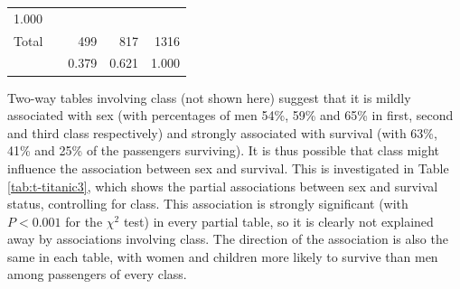 \documentclass[11pt,a4paper,openany]{book}
\begin{document}
\begin{longtable}[]{@{}llrrr@{}}
\begin{minipage}[t]{0.07\columnwidth}
1.000\strut
\end{minipage}\tabularnewline
\begin{minipage}[t]{0.30\columnwidth}\raggedright\strut
Total\strut
\end{minipage} & \begin{minipage}[t]{0.14\columnwidth}\raggedright\strut
\strut
\end{minipage} & \begin{minipage}[t]{0.27\columnwidth}\raggedleft\strut
499\strut
\end{minipage} & \begin{minipage}[t]{0.07\columnwidth}\raggedleft\strut
817\strut
\end{minipage} & \begin{minipage}[t]{0.07\columnwidth}\raggedleft\strut
1316\strut
\end{minipage}\tabularnewline
\begin{minipage}[t]{0.30\columnwidth}\raggedright\strut
\strut
\end{minipage} & \begin{minipage}[t]{0.14\columnwidth}\raggedright\strut
\strut
\end{minipage} & \begin{minipage}[t]{0.27\columnwidth}\raggedleft\strut
0.379\strut
\end{minipage} & \begin{minipage}[t]{0.07\columnwidth}\raggedleft\strut
0.621\strut
\end{minipage} & \begin{minipage}[t]{0.07\columnwidth}\raggedleft\strut
1.000\strut
\end{minipage}\tabularnewline
\bottomrule
\end{longtable}

Two-way tables involving class (not shown here) suggest that it is
mildly associated with sex (with percentages of men 54\%, 59\% and 65\%
in first, second and third class respectively) and strongly associated
with survival (with 63\%, 41\% and 25\% of the passengers surviving). It
is thus possible that class might influence the association between sex
and survival. This is investigated in Table \ref{tab:t-titanic3}, which
shows the partial associations between sex and survival status,
controlling for class. This association is strongly significant (with
\(P<0.001\) for the \(\chi^{2}\) test) in every partial table, so it is
clearly not explained away by associations involving class. The
direction of the association is also the same in each table, with women
and children more likely to survive than men among passengers of every
class.
\end{document}
